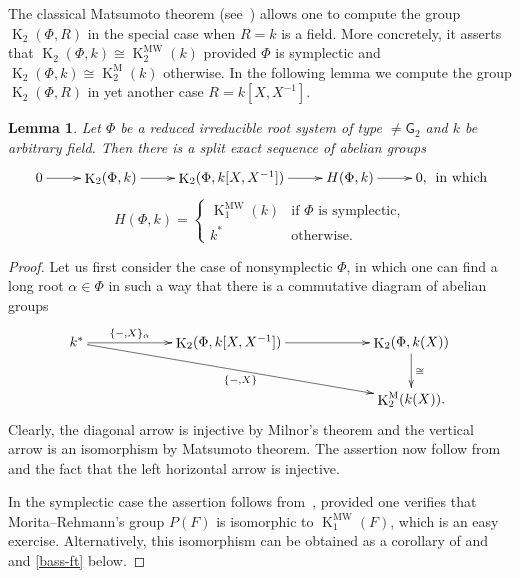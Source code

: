\documentclass[oneside, 8pt]{amsart}
\newtheorem{lemma}{Lemma}
\theoremstyle{remark}
\theoremstyle{definition}
\DeclareMathOperator{\K}{K}
\newcommand{\inv}{^{-1}}
\newcommand{\rG}{\mathsf{G}}
\numberwithin{equation}{section}
\begin{document}
\begin{comment}
Suppose for a moment that $\langle \alpha, \beta \rangle = -1$ and  $\langle \beta, \alpha \rangle = -1$ then
\[ \{s, t^{-1} \} = \{s,  t^{-1}\}_\alpha = \{t, s^{-1} \}_\beta^{-1} = \{s^{-1}, t\} \]
In particular, $\{s, s^{-1}\} = \{s, s^{-1}\}^{-1}$ 
\end{comment}
The classical Matsumoto theorem (see~\cite[Theorem~5.10]{Ma69}) allows one to compute the group $\K_2(\Phi, R)$ in the special case when $R=k$ is a field. More concretely, it asserts that $\K_2(\Phi, k) \cong \K_2^\mathrm{MW}(k)$ provided $\Phi$ is symplectic and  $\K_2(\Phi, k) \cong \K_2^\mathrm{M}(k)$ otherwise. In the following lemma we compute the group $\K_2(\Phi, R)$ in yet another case $R=k[X, X\inv]$.
\begin{lemma}\label{K2-laurent-field} Let $\Phi$ be a reduced irreducible root system of type $\neq \rG_2$ and $k$ be arbitrary field. Then there is a split exact sequence of abelian groups
\[ \xymatrix{ 0 \ar[r] & \K_2(\Phi, k) \ar[r] & \K_2(\Phi, k[X, X^{-1}]) \ar[r] & H(\Phi, k) \ar[r] & 0,}\text{ in which} \]
\[ H(\Phi, k) = \left\{\begin{array}{ll} \K_1^\mathrm{MW}(k)& \text{if $\Phi$ is symplectic,}\\ k^* & \text{otherwise.}  \end{array}\right. \]  \end{lemma}
\begin{proof} Let us first consider the case of nonsymplectic $\Phi$, in which one can find a long root $\alpha\in \Phi$ in such a way that there is a commutative diagram of abelian groups
\[\xymatrixcolsep{5pc}\xymatrix{k^* \ar[r]^-{\{ -, X \}_{\alpha}} \ar[rrd]_{\{-, X\}} & \K_2(\Phi, k[X, X^{-1}]) \ar[r] & \K_2(\Phi, k(X)) \ar[d]^{\cong} \\
                                                                                      &                                 & \K_2^\mathrm{M}(k(X)).} \]
Clearly, the diagonal arrow is injective by Milnor's theorem and the vertical arrow is an isomorphism by Matsumoto theorem. The assertion now follow from~\cite[Satz~3]{Hur77} and the fact that the left horizontal arrow is injective.

In the symplectic case the assertion follows from~\cite[Theorem~B]{MR91}, provided one verifies that Morita--Rehmann's group $P(F)$ is isomorphic to $\K_1^\mathrm{MW}(F)$,
 which is an easy exercise. Alternatively, this isomorphism can be obtained as a corollary of and~\cite[Lemma~4.1.1]{AF17} and \cref{bass-ft} below. \end{proof}
 
\end{document}
